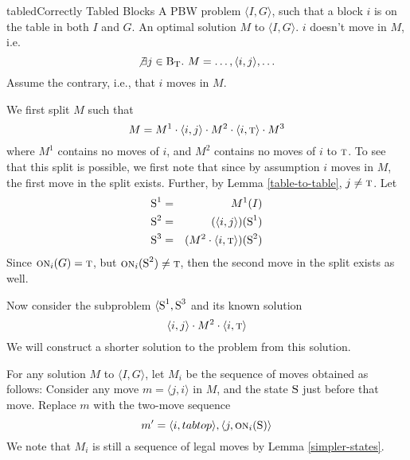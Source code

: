 \documentclass{article}
\newcommand{\have}{{.~}}
\newcommand{\bstate}{{\mbox{\cal S}}}
\newcommand{\blocks}{{\mbox{\cal B}}}
\newcommand{\tabtop}{{\mbox{\sc t}}}
\newcommand{\tblocks}{{\blocks_\tabtop}}
\newcommand{\bon}{{\mbox{\sc on}}}
\begin{document}
\begin{lemma}{tabled}{Correctly Tabled Blocks}
\given
A PBW problem $\langle I, G \rangle$, such that
a block $i$ is on the table in both $I$ and $G$.
An optimal solution $M$ to $\langle I, G \rangle$.
\prove
$i$ doesn't move in $M$, i.e. $$
  \not \exists j \in \tblocks \have
    M = \ldots, \langle i, j \rangle, \ldots
$$
\proof
Assume the contrary, i.e., that $i$ moves in $M$.

We first split $M$ such that $$
  M = M^1 \cdot \langle i, j \rangle \cdot M^2 \cdot
  \langle i, \tabtop \rangle \cdot M^3
$$
where $M^1$ contains no moves of $i$, and
$M^2$ contains no moves of $i$ to $\tabtop$.
To see that this split is possible, we first note
that since by assumption $i$ moves in $M$, the first
move in the split exists.  Further, by Lemma
\ref{table-to-table}, $j \neq \tabtop$.
Let \begin{eqnarray*}
\bstate^1 &=& M^1(I) \\
\bstate^2 &=& (\langle i, j \rangle)(\bstate^1) \\
\bstate^3 &=& (M^2 \cdot \langle i, \tabtop \rangle)(\bstate^2)
\end{eqnarray*}
Since
$\bon_i(G) = \tabtop$, but $\bon_i(\bstate^2) \neq \tabtop$,
then the second move in the split exists as well.

Now consider the subproblem $\langle \bstate^1, \bstate^3$ and its known
solution $$
  \langle i, j \rangle \cdot M^2 \cdot \langle i, \tabtop \rangle
$$
We will construct a shorter solution to the problem from this
solution.

For any solution $M$ to $\langle I, G \rangle$,
let $M_i$ be the sequence of moves obtained as follows:
Consider any move $m = \langle j, i \rangle$ in $M$, and the
state $\bstate$ just before that move.  Replace $m$ with the two-move
sequence $$
  m' = \langle i, tabtop \rangle, \langle j, \bon_i(\bstate) \rangle
$$
We note that $M_i$ is still a sequence of
legal moves by Lemma \ref{simpler-states}.

\end{lemma}
\end{document}
